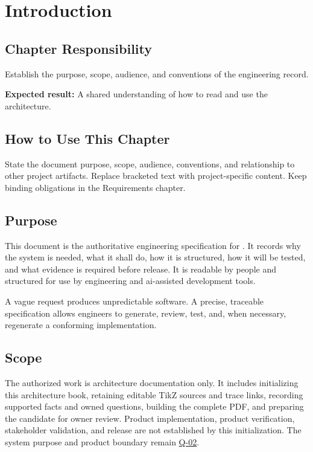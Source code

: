 \chapter{Introduction}

\section{Chapter Responsibility}
\label{Section:IntroductionResponsibility}
Establish the purpose, scope, audience, and conventions of the engineering record.

\noindent\textbf{Expected result:} A shared understanding of how to read and use the architecture.

\section{How to Use This Chapter}
State the document purpose, scope, audience, conventions, and relationship to
other project artifacts. Replace bracketed text with project-specific content.
Keep binding obligations in the Requirements chapter.

\section{Purpose}
This document is the authoritative engineering specification for
\ProjectName. It records why the system is needed, what it shall do, how it is
structured, how it will be tested, and what evidence is required before
release. It is readable by people and structured for use by engineering and
\gls{ai}-assisted development tools.

\begin{dsnNote}
A vague request produces unpredictable software. A precise, traceable
specification allows engineers to generate, review, test, and, when necessary,
regenerate a conforming implementation.
\end{dsnNote}

\section{Scope}
The authorized work is architecture documentation only. It includes initializing
this architecture book, retaining editable TikZ sources and trace links,
recording supported facts and owned questions, building the complete PDF,
and preparing the candidate for owner review. Product implementation,
product verification, stakeholder validation, and release are not established
by this initialization. The system purpose and product boundary remain
\hyperref[Question:Q-02]{Q-02}.

